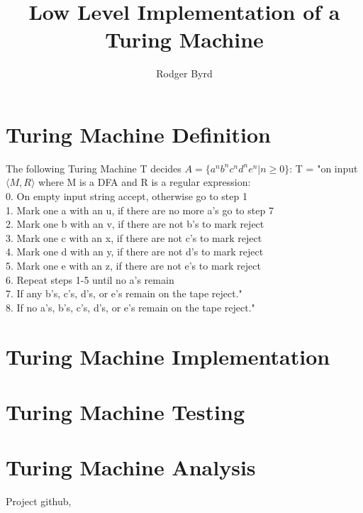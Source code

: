 \documentclass{article}
\begin{document}
\raggedright

\title{Low Level Implementation of a Turing Machine}
\author{Rodger Byrd}
\maketitle

\section{Turing Machine Definition}
The following Turing Machine T decides $A=\{a^{n}b^{n}c^{n}d^{n}e^{n} \vert n \geq 0\}$:\break
T = "on input $\langle M,R\rangle$ where M is a DFA and R is a regular expression:\\
\hspace{20 pt} 0. On empty input string accept, otherwise go to step 1\\
\hspace{20 pt} 1. Mark one a with an u, if there are no more a's go to step 7\\
\hspace{20 pt} 2. Mark one b with an v, if there are not b's to mark reject\\
\hspace{20 pt} 3. Mark one c with an x, if there are not c's to mark reject\\
\hspace{20 pt} 4. Mark one d with an y, if there are not d's to mark reject\\
\hspace{20 pt} 5. Mark one e with an z, if there are not e's to mark reject\\
\hspace{20 pt} 6. Repeat steps 1-5 until no a's remain\\
\hspace{20 pt} 7. If any b's, c's, d's, or e's remain on the tape reject."\\
\hspace{20 pt} 8. If no a's, b's, c's, d's, or e's remain on the tape reject."
\section{Turing Machine Implementation}

\section{Turing Machine Testing}

\section{Turing Machine Analysis}

\begin{thebibliography}{9}
Project github,
\\

\end{thebibliography}
\end{document}
